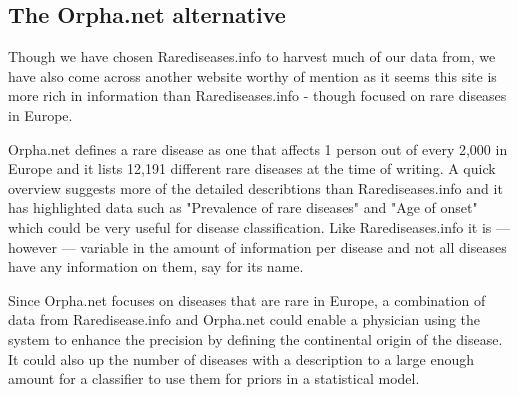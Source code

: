 \subsection{The Orpha.net alternative}

Though we have chosen Rarediseases.info to harvest much of our data from, 
we have also come across another website worthy of mention as it seems 
this site is more rich in information than Rarediseases.info - though 
focused on rare diseases in Europe.

Orpha.net defines a rare disease as one that affects 1 person out of 
every 2,000 in Europe and it lists 12,191 different rare diseases at 
the time of writing. A quick overview suggests more of the detailed 
describtions than Rarediseases.info and it has highlighted data such 
as "Prevalence of rare diseases" and "Age of onset" which could be very 
useful for disease classification. Like Rarediseases.info it is 
--- however --- variable in the amount of information per disease and 
not all diseases have any information on them, say for its name.

Since Orpha.net focuses on diseases that are rare in Europe, a combination 
of data from Raredisease.info and Orpha.net could enable a physician using 
the system to enhance the precision by defining the continental origin of 
the disease. It could also up the number of diseases with a description to 
a large enough amount for a classifier to use them for priors in a 
statistical model. 